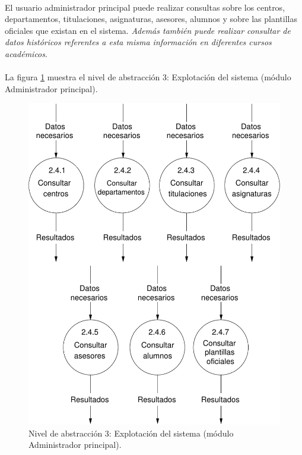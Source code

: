 \paragraph{}El usuario administrador principal puede realizar consultas sobre
los centros, departamentos, titulaciones, asignaturas, asesores, alumnos y sobre
las plantillas oficiales que existan en el sistema.
\textit{Además también puede realizar consultar de datos históricos referentes a
esta misma información en diferentes cursos académicos}.

\paragraph{}La figura \ref{diagramaNivel3-ExplotacionSistema-adminPrincipal}
muestra el nivel de abstracción 3: Explotación del sistema (módulo Administrador
principal).

  \begin{figure}[!ht]
    \begin{center}
      \includegraphics[]{08.Analisis_Funcional/8.2.DFDs/Niveles/Nivel3/AdministradorPrincipal/ExplotacionSistema/Diagramas/nivel3-ExplotacionSistema.pdf}
      \caption{Nivel de abstracción 3: Explotación del sistema (módulo
      Administrador principal).}
      \label{diagramaNivel3-ExplotacionSistema-adminPrincipal}
    \end{center}
  \end{figure}
